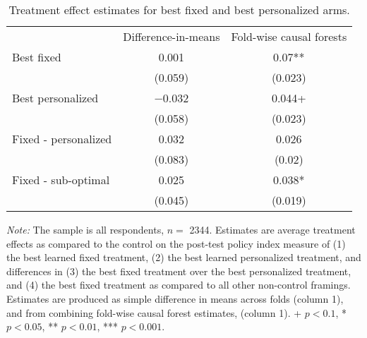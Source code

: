 \begin{table*}

\caption{Treatment effect estimates for best fixed and best personalized arms. \label{tab:best_framing}}
\centering
\begin{threeparttable}
\begin{tabular}[t]{lcc}
\toprule
 & Difference-in-means & Fold-wise causal forests\\
\cmidrule(lr){2-2} \cmidrule(lr){3-3}
Best fixed & \num{0.001} & \num{0.07}**\\
 & (\num{0.059}) & (\num{0.023})\\
\addlinespace
Best personalized & \num{-0.032} & \num{0.044}+\\
 & (\num{0.058}) & (\num{0.023})\\
\cmidrule(lr){2-2} \cmidrule(lr){3-3}
\addlinespace
Fixed - personalized & \num{0.032} & \num{0.026}\\
 & (\num{0.083}) & (\num{0.02})\\
\addlinespace
Fixed - sub-optimal & \num{0.025} & \num{0.038}*\\
 & (\num{0.045}) & (\num{0.019})\\
\bottomrule
\end{tabular}
\begin{tablenotes}
\item \footnotesize \textit{Note:} The sample is all respondents, $n = $ \num{2344}. Estimates are average treatment effects as compared to the control on the post-test policy index measure of (1) the best learned fixed treatment, (2) the best learned personalized treatment, and differences in (3) the best fixed treatment over the best personalized treatment, and (4) the best fixed treatment as compared to all other non-control framings. Estimates are produced as simple difference in means across folds (column 1), and from combining fold-wise causal forest estimates, (column 1). + $p < 0.1$, * $p < 0.05$, ** $p < 0.01$, *** $p < 0.001$.
\end{tablenotes}
\end{threeparttable}
\end{table*}
